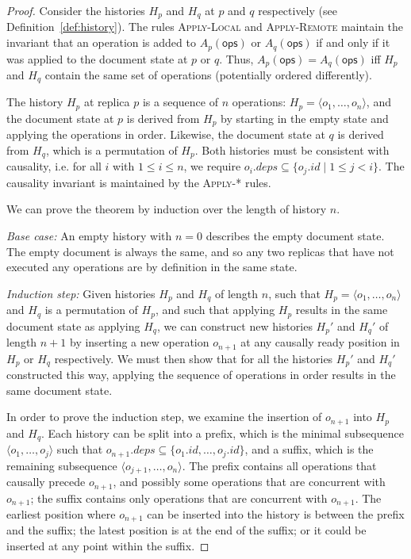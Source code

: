 \documentclass[10pt,journal,compsoc]{IEEEtran}
\begin{document}
\begin{proof}
Consider the histories $H_p$ and $H_q$ at $p$ and $q$ respectively (see Definition~\ref{def:history}). The rules \textsc{Apply-Local} and \textsc{Apply-Remote} maintain the invariant that an operation is added to $A_p(\mathsf{ops})$ or $A_q(\mathsf{ops})$ if and only if it was applied to the document state at $p$ or $q$. Thus, $A_p(\mathsf{ops}) = A_q(\mathsf{ops})$ iff $H_p$ and $H_q$ contain the same set of operations (potentially ordered differently).

The history $H_p$ at replica $p$ is a sequence of $n$ operations: $H_p = \langle o_1, \dots, o_n \rangle$, and the document state at $p$ is derived from $H_p$ by starting in the empty state and applying the operations in order. Likewise, the document state at $q$ is derived from $H_q$, which is a permutation of $H_p$. Both histories must be consistent with causality, i.e. for all $i$ with $1 \le i \le n$, we require $o_i.\mathit{deps} \subseteq \{o_j.\mathit{id} \mid 1 \le j < i\}$. The causality invariant is maintained by the \textsc{Apply-*} rules.

We can prove the theorem by induction over the length of history $n$.

\emph{Base case:} An empty history with $n=0$ describes the empty document state. The empty document is always the same, and so any two replicas that have not executed any operations are by definition in the same state.

\emph{Induction step:} Given histories $H_p$ and $H_q$ of length $n$, such that $H_p = \langle o_1, \dots, o_n \rangle$ and $H_q$ is a permutation of $H_p$, and such that applying $H_p$ results in the same document state as applying $H_q$, we can construct new histories $H_p'$ and $H_q'$ of length $n+1$ by inserting a new operation $o_{n+1}$ at any causally ready position in $H_p$ or $H_q$ respectively. We must then show that for all the histories $H_p'$ and $H_q'$ constructed this way, applying the sequence of operations in order results in the same document state.

In order to prove the induction step, we examine the insertion of $o_{n+1}$ into $H_p$ and $H_q$. Each history can be split into a prefix, which is the minimal subsequence $\langle o_1, \dots, o_j \rangle$ such that $o_{n+1}.\mathit{deps} \subseteq \{o_1.\mathit{id}, \dots, o_j.\mathit{id}\}$, and a suffix, which is the remaining subsequence $\langle o_{j+1}, \dots, o_n \rangle$. The prefix contains all operations that causally precede $o_{n+1}$, and possibly some operations that are concurrent with $o_{n+1}$; the suffix contains only operations that are concurrent with $o_{n+1}$. The earliest position where $o_{n+1}$ can be inserted into the history is between the prefix and the suffix; the latest position is at the end of the suffix; or it could be inserted at any point within the suffix.


\end{proof}
\end{document}
